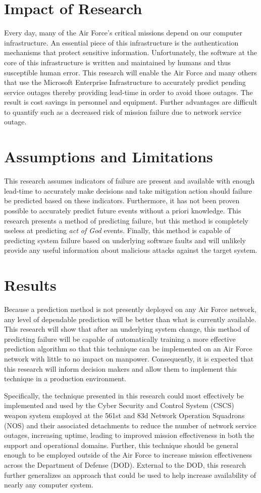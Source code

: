 \section{Impact of Research}
Every day, many of the Air Force's critical missions depend on our computer
infrastructure.  An essential piece of this infrastructure is the
authentication mechanisms that protect  sensitive information.
Unfortunately, the software at the core of this infrastructure is written and
maintained by humans and thus susceptible human error.  This research will
enable the Air Force and many others that use the Microsoft Enterprise
Infrastructure to accurately predict pending service outages thereby providing
lead-time in order to avoid those outages.  The result is cost savings in
personnel and equipment.  Further advantages are difficult to quantify such as
a decreased risk of mission failure due to network service outage.

\section{Assumptions and Limitations}
This research assumes indicators of failure are present and available with
enough lead-time to accurately make decisions and take mitigation action should
failure be predicted based on these indicators.  Furthermore, it has not been
proven possible to accurately predict future events without a priori knowledge.
This research presents a method of predicting failure, but this method is
completely useless at predicting \emph{act of God} events.  Finally, this
method is capable of predicting system failure based on underlying software
faults and will unlikely provide any useful information about malicious
attacks against the target system.

\section{Results}
Because a prediction method is not presently deployed on any Air Force network,
any level of dependable prediction will be better than what is currently
available.  This research will show that after an underlying system change,
this method of predicting failure will be capable of automatically training a
more effective prediction algorithm so that this technique can be implemented
on an Air Force network with little to no impact on manpower.  Consequently, it
is expected that this research will inform decision makers and allow them to
implement this technique in a production environment.

Specifically, the technique presented in this research could most effectively
be implemented and used by the Cyber Security and Control System (CSCS) weapon
system employed at the 561st and 83d Network Operation Squadrons (NOS) and
their associated detachments to reduce the number of network service outages,
increasing uptime, leading to improved mission effectiveness in both the
support and operational domains.  Further, this technique should be general
enough to be employed outside of the Air Force to increase mission
effectiveness across the Department of Defense (DOD).  External to the DOD,
this research further generalizes an approach that could be used to help
increase availability of nearly any computer system.
